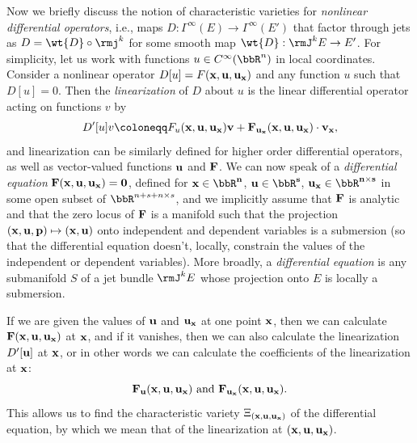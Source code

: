 Now we briefly discuss the notion of characteristic varieties for \emph{nonlinear differential operators}, i.e., maps $D:\Gamma^\infty(E)\to \Gamma^\infty(E')$ that factor through jets as $D=\wt{D}\circ \rmj^k$ for some smooth map $\wt{D}:\rmJ^kE\to E'$. For simplicity, let us work with functions $u\in C^\infty(\bbR^n)$ in local coordinates. Consider a nonlinear operator $D[u]=F(\bf{x},u,u_{\bf{x}})$ and any function $u$ such that $D[u]=0$. Then the \emph{linearization} of $D$ about $u$ is the linear differential operator acting on functions $v$ by
\[D'[u]v\coloneqq F_u(\bf{x},u,u_{\bf{x}})v+F_{u_{\bf{x}}}(\bf{x},u,u_{\bf{x}})\cdot v_{\bf{x}},\]
and linearization can be similarly defined for higher order differential operators, as well as vector-valued functions $\bf{u}$ and $\bf{F}$. We can now speak of a \emph{differential equation} $\bf{F}(\bf{x},\bf{u},\bf{u}_{\bf x})=0$, defined for $\bf{x}\in\bbR^n$, $\bf{u}\in\bbR^s$, $\bf{u}_{\bf x}\in\bbR^{n\times s}$ in some open subset of $\bbR^{n+s+n\times s}$, and we implicitly assume that $\bf{F}$ is analytic and that the zero locus of $\bf{F}$ is a manifold such that the projection $(\bf{x},\bf{u},\bf{p})\mapsto (\bf{x},\bf{u})$ onto independent and dependent variables is a submersion (so that the differential equation doesn't, locally, constrain the values of the independent or dependent variables). More broadly, a \emph{differential equation} is any submanifold $S$ of a jet bundle $\rmJ^k E$ whose projection onto $E$ is locally a submersion.

If we are given the values of $\bf{u}$ and $\bf{u}_{\bf{x}}$ at one point $\bf{x}$, then we can calculate $\bf{F}(\bf{x},\bf{u},\bf{u}_{\bf x})$ at $\bf{x}$, and if it vanishes, then we can also calculate the linearization $D'[\bf{u}]$ at $\bf{x}$, or in other words we can calculate the coefficients of the linearization at $\bf{x}$:
\[\bf{F}_{\bf{u}}(\bf{x},\bf{u},\bf{u}_{\bf{x}})\text{ and }\bf{F}_{\bf{u}_{\bf{x}}}(\bf{x},\bf{u},\bf{u}_{\bf{x}}).\]
This allows us to find the characteristic variety $\Xi_{(\bf{x},\bf{u},\bf{u}_{\bf x})}$ of the differential equation, by which we mean that of the linearization at $(\bf{x},\bf{u},\bf{u}_{\bf{x}})$.

